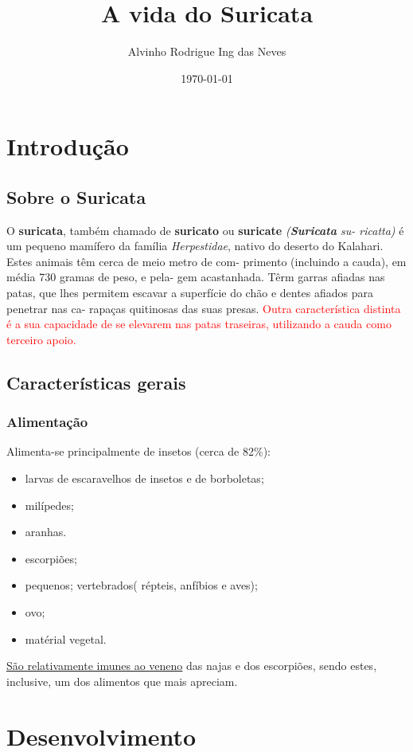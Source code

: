 \documentclass[a4paper,11pt]{report}
\title{A vida do Suricata}
\author{Alvinho Rodrigue Ing das Neves}
\date{\today}
\begin{document}
\maketitle
{}
\chapter{Introdução}
\section{Sobre o Suricata}
O \textbf{suricata}, também chamado de  \textbf{suricato} ou  \textbf{suricate} \textit{(\textbf{Suricata} su-
ricatta)} é um pequeno mamífero da família \textit{Herpestidae}, nativo do
deserto do Kalahari. Estes animais têm cerca de meio metro de com-
primento (incluindo a cauda), em média 730 gramas de peso, e pela-
gem acastanhada. Têrm garras afiadas nas patas, que lhes permitem
escavar a superfície do chão e dentes afiados para penetrar nas ca-
rapaças quitinosas das suas presas. \textcolor{red}{Outra característica distinta é a sua capacidade de se elevarem nas patas traseiras, utilizando a cauda como terceiro apoio.}

\section{Características gerais}
\subsection{Alimentação}
Alimenta-se principalmente de insetos (cerca de 82\%):
\begin{itemize}
\item larvas de escaravelhos de insetos e de borboletas;
\item milípedes;
\item aranhas.
\end{itemize}

\begin{itemize}
\item escorpiões;
\item pequenos; vertebrados( répteis, anfíbios e aves);
\item ovo;
\item matérial vegetal.
\end{itemize}
\uline {São relativamente imunes ao veneno} das najas  e dos escorpiões, sendo  estes, inclusive, um dos alimentos que  mais apreciam.
\chapter{Desenvolvimento}
\end{document}
